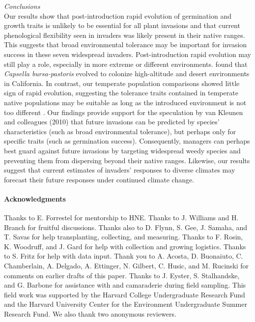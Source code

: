 \documentclass[11pt]{article}\usepackage[]{graphicx}\usepackage[]{color}
\begin{document}
\emph{Conclusions}\\ 
	Our results show that post-introduction rapid evolution of germination and growth traits is unlikely to be essential for all plant invasions and that current phenological flexibility seen in invaders was likely present in their native ranges. This suggests that broad environmental tolerance may be important for invasion success in these seven widespread invaders. Post-introduction rapid evolution may still play a role, especially in more extreme or different environments.  \textcite{Linde2001} found that \textit{Capsella bursa-pastoris} evolved to colonize high-altitude and desert environments in California. In contrast, our temperate population comparisons showed little sign of rapid evolution, suggesting the tolerance traits contained in temperate native populations may be suitable as long as the introduced environment is not too different \parencite{Baker1965}. Our findings provide support for  the speculation by van Kleunen and colleagues (2010) that future invasions can be predicted by species' characteristics (such as broad environmental tolerance), but perhaps only for specific traits (such as germination success). Consequently, managers can perhaps best guard against future invasions by targeting widespread weedy species and preventing them from dispersing beyond their native ranges. Likewise, our results suggest that current estimates of invaders' responses to diverse climates may forecast their future responses under continued climate change. 
	
\paragraph{Acknowledgments}
Thanks to E. Forrestel for mentorship to HNE. Thanks to J. Williams and H. Branch for fruitful discussions. Thanks also to D. Flynn, S. Gee, J. Samaha, and T. Savas for help transplanting, collecting, and measuring. Thanks to F. Rosin, K. Woodruff, and J. Gard for help with collection and growing logistics. Thanks to S. Fritz for help with data input. Thank you to A. Acosta, D. Buonaiuto, C. Chamberlain, A. Delgado, A. Ettinger, N. Gilbert, C. Husic, and M. Rucinski for comments on earlier drafts of this paper. Thanks to J. Eyster, S. Stalhandske, and G. Barbone for assistance with and camaraderie during field sampling. This field work was supported by the Harvard College Undergraduate Research Fund and the Harvard University Center for the Environment Undergraduate Summer Research Fund.  We also thank two anonymous reviewers. %
\end{document}
